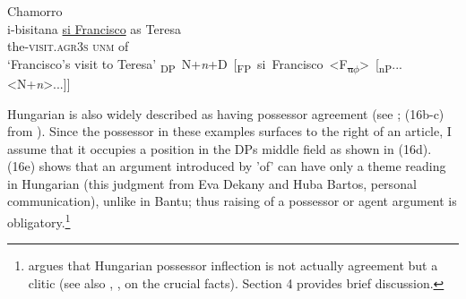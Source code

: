 \documentclass[output=paper
,modfonts
,nonflat]{langsci/langscibook}
\begin{document}
\begin{exe}
	\ex Chamorro\\
	\xlist
	\ex 
	\gll i-bisitana       \underline{si Francisco}   as Teresa \\
	the-\textsc{visit.agr3s}     \textsc{unm}            of\\
	\glt `Francisco's visit to Teresa'  	
	\ex \mbox{{\lbrack}\textsubscript{DP} N+\textit{n}+D [\textsubscript{FP} si Francisco  <F\textsubscript{\sout{u}}\textsubscript{\sout{$\phi$}}> [\textsubscript{nP}...<N+\textit{n}>...]]{\rbrack}}
	\endxlist
\end{exe}
Hungarian is also widely described as having possessor agreement (see \citealt{Szabolsci1983, Szabolsci1994};  (16b-c) from \citealt[139]{Den_Dikken1999}). Since the possessor in these examples surfaces to the right of an article, I assume that it occupies a position in the DPs middle field as shown in (16d). (16e) shows that an argument introduced by 'of' can have only a theme reading in Hungarian (this judgment from Eva Dekany and Huba Bartos, personal communication), unlike in Bantu; thus raising of a possessor or agent argument is obligatory.\footnote{\citet{Den_Dikken2015} argues that Hungarian possessor inflection is not actually agreement but a clitic (see also \citealt{Den_Dikken1999}, \citealt{Bartos1999}, \citealt{Kiss2002} on the crucial facts). Section 4 provides brief discussion.} 
\end{document}
